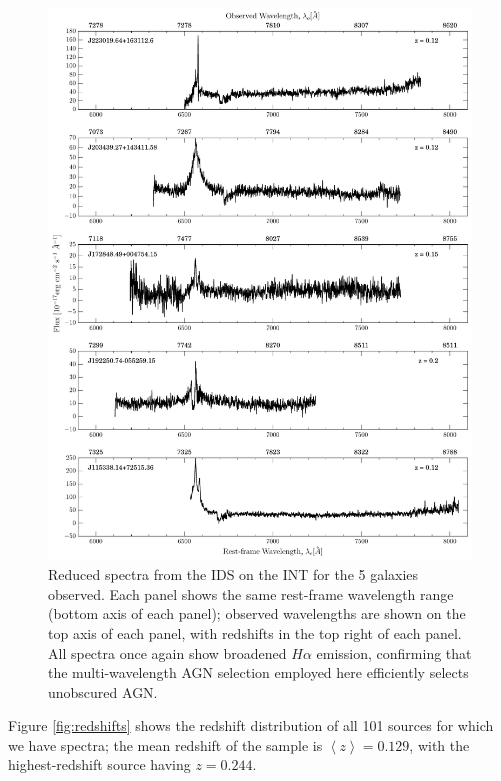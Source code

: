 \begin{figure}
\centering
\includegraphics[height=0.8\textheight]{agn/int_spectra.pdf}
\caption[Optical spectra of 5 \textsc{bulgeless} galaxies observed on the INT with the IDS]{Reduced spectra from the IDS on the INT for the 5 galaxies observed. Each panel shows the same rest-frame wavelength range (bottom axis of each panel); observed wavelengths are shown on the top axis of each panel, with redshifts in the top right of each panel. All spectra once again show broadened $H\alpha$ emission, confirming that the multi-wavelength AGN selection employed here efficiently selects unobscured AGN.}
\label{fig:INTspectra}
\end{figure}


Figure \ref{fig:redshifts} shows the redshift distribution of all 101 sources for which we have spectra; the mean redshift of the sample is $\left< z \right> = 0.129$, with the highest-redshift source having $z = 0.244$. 


